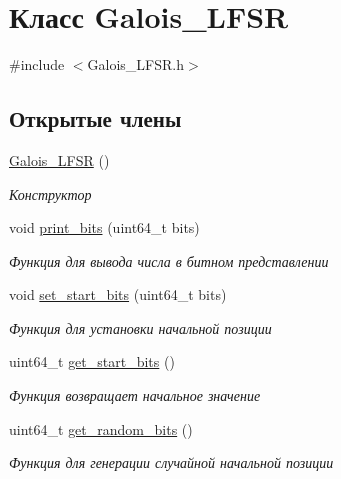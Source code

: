 \hypertarget{classGalois__LFSR}{}\section{Класс Galois\+\_\+\+L\+F\+SR}
\label{classGalois__LFSR}


{\ttfamily \#include $<$Galois\+\_\+\+L\+F\+S\+R.\+h$>$}

\subsection*{Открытые члены}
\begin{DoxyCompactItemize}
\item 
\mbox{\label{classGalois__LFSR_a23455fca80e4ed521062a7b2842edb03}} 
\hyperlink{classGalois__LFSR_a23455fca80e4ed521062a7b2842edb03}{Galois\+\_\+\+L\+F\+SR} ()
\begin{DoxyCompactList}\small\item\em Конструктор \end{DoxyCompactList}\item 
void \hyperlink{classGalois__LFSR_a7a2d2fa3f9f7973cb520d92267f58f4d}{print\+\_\+bits} (uint64\+\_\+t bits)
\begin{DoxyCompactList}\small\item\em Функция для вывода числа в битном представлении \end{DoxyCompactList}\item 
void \hyperlink{classGalois__LFSR_aa3a893992b929b01a649d859a121ae34}{set\+\_\+start\+\_\+bits} (uint64\+\_\+t bits)
\begin{DoxyCompactList}\small\item\em Функция для установки начальной позиции \end{DoxyCompactList}\item 
uint64\+\_\+t \hyperlink{classGalois__LFSR_aea6f1eea9ba930bb7419426a45a59c5c}{get\+\_\+start\+\_\+bits} ()
\begin{DoxyCompactList}\small\item\em Функция возвращает начальное значение \end{DoxyCompactList}\item 
uint64\+\_\+t \hyperlink{classGalois__LFSR_abc5cfd0aa22803188a1f81a5959f22eb}{get\+\_\+random\+\_\+bits} ()
\begin{DoxyCompactList}\small\item\em Функция для генерации случайной начальной позиции \end{DoxyCompactList}\item 

\end{DoxyCompactItemize}
